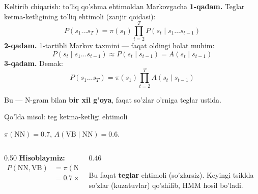 \documentclass[aspectratio=169,11pt]{beamer}
\begin{document}
\begin{frame}{Keltirib chiqarish: to'liq qo'shma ehtimoldan Markovgacha}
  \textbf{1-qadam.} Teglar ketma-ketligining to'liq ehtimoli (zanjir qoidasi):
  $$ P(s_1\ldots s_T) = \pi(s_1)\prod_{t=2}^{T} P(s_t\mid s_1\ldots s_{t-1}) $$
  \pause
  \textbf{2-qadam.} 1-tartibli Markov taxmini --- faqat oldingi holat muhim:
  $$ P(s_t\mid s_1\ldots s_{t-1}) \approx P(s_t\mid s_{t-1}) = A(s_t\mid s_{t-1}) $$
  \pause
  \textbf{3-qadam.} Demak:
  $$ P(s_1\ldots s_T) = \pi(s_1)\prod_{t=2}^{T} A(s_t\mid s_{t-1}) $$
  \begin{tcolorbox}[okbox,top=2pt,bottom=2pt]
    \small Bu --- N-gram bilan \textbf{bir xil g'oya}, faqat so'zlar o'rniga
    teglar ustida.
  \end{tcolorbox}
\end{frame}

\begin{frame}{Qo'lda misol: teg ketma-ketligi ehtimoli}
  \begin{tcolorbox}[defbox,title=Ketma-ketlik: NN -> VB]
    \small $\pi(\text{NN})=0.7$, \quad $A(\text{VB}\mid\text{NN})=0.6$.
  \end{tcolorbox}
  \vspace{0.2em}
  \begin{columns}[T]
    \begin{column}{0.50\textwidth}
      \textbf{Hisoblaymiz:}
      \begin{align*}
        P(\text{NN},\text{VB}) &= \pi(\text{NN})\cdot A(\text{VB}\mid\text{NN})\\
          &= 0.7 \times 0.6 = \mathbf{0.42}
      \end{align*}
    \end{column}
    \begin{column}{0.46\textwidth}
      \begin{tcolorbox}[okbox,top=2pt,bottom=2pt]
        \footnotesize
        Bu faqat \textbf{teglar} ehtimoli (so'zlarsiz). Keyingi tsiklda
        so'zlar (kuzatuvlar) qo'shilib, HMM hosil bo'ladi.
      \end{tcolorbox}
    \end{column}
  \end{columns}
\end{frame}
\end{document}
